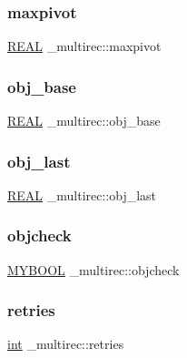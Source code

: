 \subsubsection{\texorpdfstring{maxpivot}{maxpivot}}
{\footnotesize\ttfamily \hyperlink{lp__lib_8h_a92bd5e363d131fa73669358edb232dce}{R\+E\+AL} \+\_\+multirec\+::maxpivot}

\mbox{\label{struct__multirec_a045020cc9ed8411f608d8f64714681cd}} 
\subsubsection{\texorpdfstring{obj\+\_\+base}{obj\_base}}
{\footnotesize\ttfamily \hyperlink{lp__lib_8h_a92bd5e363d131fa73669358edb232dce}{R\+E\+AL} \+\_\+multirec\+::obj\+\_\+base}

\mbox{\label{struct__multirec_ae2a6387e0e8e5d4b2e4ac55d837ef258}} 
\subsubsection{\texorpdfstring{obj\+\_\+last}{obj\_last}}
{\footnotesize\ttfamily \hyperlink{lp__lib_8h_a92bd5e363d131fa73669358edb232dce}{R\+E\+AL} \+\_\+multirec\+::obj\+\_\+last}

\mbox{\label{struct__multirec_a905aac80bbab82f4f0e5e6ce174a5896}} 
\subsubsection{\texorpdfstring{objcheck}{objcheck}}
{\footnotesize\ttfamily \hyperlink{lp__lib_8h_aad848328fb3018217ac9f01d97b6bd88}{M\+Y\+B\+O\+OL} \+\_\+multirec\+::objcheck}

\mbox{\label{struct__multirec_a2f6297781e3308811c1f4cac182bb104}} 
\subsubsection{\texorpdfstring{retries}{retries}}
{\footnotesize\ttfamily \hyperlink{lp__lib_8h_adeb9ec6400320e4923ac9d836d509ddb}{int} \+\_\+multirec\+::retries}


